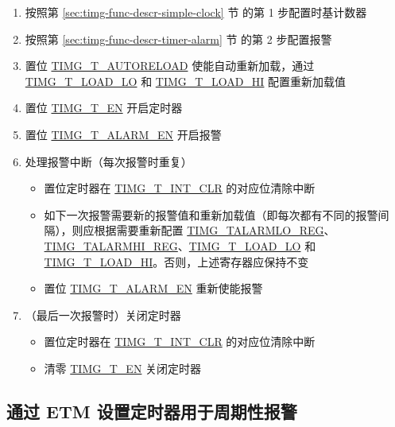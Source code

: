 \documentclass[main\_\_CN.tex]{subfiles}
\begin{document}
\begin{enumerate}
    \item 按照第 \ref{sec:timg-func-descr-simple-clock} 节 \textit{} 的第 1 步配置时基计数器
    \item 按照第 \ref{sec:timg-func-descr-timer-alarm} 节 \textit{} 的第 2 步配置报警
    \item 置位 \hyperref[fielddesc:TIMGTXAUTORELOAD]{TIMG\_T\_AUTORELOAD} 使能自动重新加载，通过 \hyperref[fielddesc:TIMGTXLOADLO]{TIMG\_T\_LOAD\_LO} 和 \hyperref[fielddesc:TIMGTXLOADHI]{TIMG\_T\_LOAD\_HI} 配置重新加载值
    \item 置位 \hyperref[fielddesc:TIMGTXEN]{TIMG\_T\_EN} 开启定时器
    \item 置位 \hyperref[fielddesc:TIMGTXALARMEN]{TIMG\_T\_ALARM\_EN} 开启报警
    \item 处理报警中断（每次报警时重复）
    \begin{itemize}
        \item 置位定时器在 \hyperref[fielddesc:TIMGTXINTCLR]{TIMG\_T\_INT\_CLR} 的对应位清除中断
        \item 如下一次报警需要新的报警值和重新加载值（即每次都有不同的报警间隔），则应根据需要重新配置 \hyperref[regdesc:TIMGTXALARMLOREG]{TIMG\_TALARMLO\_REG}、\hyperref[regdesc:TIMGTXALARMHIREG]{TIMG\_TALARMHI\_REG}、\hyperref[fielddesc:TIMGTXLOADLO]{TIMG\_T\_LOAD\_LO} 和 \hyperref[fielddesc:TIMGTXLOADHI]{TIMG\_T\_LOAD\_HI}。否则，上述寄存器应保持不变
        \item 置位 \hyperref[fielddesc:TIMGTXALARMEN]{TIMG\_T\_ALARM\_EN} 重新使能报警
    \end{itemize}
    \item（最后一次报警时）关闭定时器
    \begin{itemize}
        \item 置位定时器在 \hyperref[fielddesc:TIMGTXINTCLR]{TIMG\_T\_INT\_CLR} 的对应位清除中断
        \item 清零 \hyperref[fielddesc:TIMGTXEN]{TIMG\_T\_EN} 关闭定时器
    \end{itemize}
\end{enumerate}

\subsection{通过 ETM 设置定时器用于周期性报警}
\label{sec:timg-conf-etm}
\end{document}
